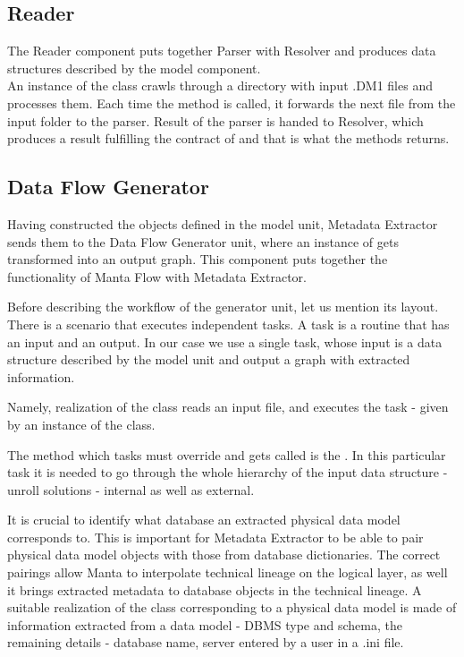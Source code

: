 \subsection{Reader}

The Reader component puts together Parser with Resolver and produces data structures described by the model component. \\

An instance of the  class crawls through a directory with input .DM1 files and processes them. 
Each time the  method is called, it forwards the next file from the input folder to the parser. Result of the parser is handed to Resolver, which produces a result fulfilling the contract of  and that is what the  methods returns.

\subsection{Data Flow Generator}

Having constructed the objects defined in the model unit, Metadata Extractor sends them to the Data Flow Generator unit, where an instance of  gets transformed into an output graph. This component puts together the functionality of Manta Flow with Metadata Extractor.

Before describing the workflow of the generator unit, let us mention its layout.
There is a scenario that executes independent tasks. A task is a routine that has an input and an output. In our case we use a single task, whose input is a data structure described by the model unit and output a graph with extracted information.

Namely, realization of the class  reads an input file, and executes the task - given by an instance of the  class. 

The method which tasks must override and gets called is the . In this particular task it is needed to go through the whole hierarchy of the input data structure -  unroll solutions - internal as well as external.

It is crucial to identify what database an extracted physical data model corresponds to.
This is important for Metadata Extractor to be able to pair physical data model objects with those from database dictionaries. The correct pairings allow Manta to interpolate technical lineage on the logical layer, as well it brings extracted metadata to database objects in the technical lineage.
A suitable realization of the  class corresponding to a physical data model is made of information extracted from a data model - DBMS type and schema, the remaining details - database name, server entered by a user in a .ini file.

